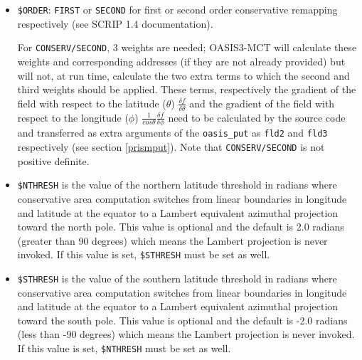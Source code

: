 \begin{itemize}
\begin{itemize}
\begin{itemize}
\begin{itemize}
        result. With {\tt DESTARTR}, an additional correction involving the ``true" area of the grid cells
        provided in the file {\tt areas.nc} is also applied, see details in the paragraph on the ``True Area'' (TR) correction below.
      \item {\tt DESTNNEI} or {\tt DESTNNTR}: as {\tt DESTAREA} or {\tt DESTARTR}, except that an additional unmasked source nearest neighbour is used for unmasked
        target cells that intersect only masked source cells.
      \end{itemize}
    \item {\tt \$ORDER}: {\tt FIRST} or {\tt SECOND} for first or
      second order conservative remapping respectively (see SCRIP 1.4
      documentation).

      For {\tt CONSERV/SECOND}, 3 weights are needed; OASIS3-MCT will
      calculate these weights and corresponding addresses (if they are
      not already provided) but will not, at run time, calculate the
      two extra terms to which the second and third weights should be
      applied. These terms, respectively the gradient of the field
      with respect to the latitude ($\theta$) $\frac{\delta f}{\delta
        \theta}$ and the gradient of the field with respect to the
      longitude ($\phi$) $\frac{1}{cos \theta}\frac{\delta f}{\delta
        \phi}$ need to be calculated by the source code and transferred
      as extra arguments of the {\tt oasis\_put} as {\tt fld2} and {\tt fld3}
      respectively (see section \ref{prismput}). Note that {\tt CONSERV/SECOND} is
      not positive definite.
    \item {\tt \$NTHRESH} is the value of the northern latitude threshold in radians 
      where conservative area computation switches from linear boundaries in
      longitude and latitude at the equator to a Lambert equivalent azimuthal projection
      toward the north pole.  This value is optional and the default is 2.0 
      radians (greater than 90 degrees) which means the Lambert projection is 
      never invoked.  If this value is set, {\tt \$STHRESH} must be set as well.
    \item {\tt \$STHRESH}  is the value of the southern latitude threshold in radians 
      where conservative area computation switches from linear boundaries in
      longitude and latitude at the equator to a Lambert equivalent azimuthal projection
      toward the south pole.  This value is optional and the default is -2.0 
      radians (less than -90 degrees) which means the Lambert projection is 
      never invoked.  If this value is set, {\tt \$NTHRESH} must be set as well.
    \end{itemize}


\end{itemize}
\end{itemize}

